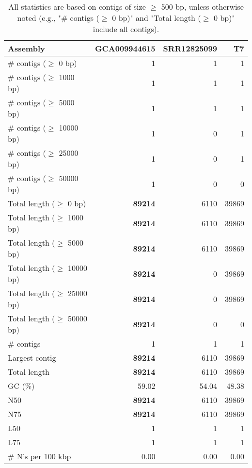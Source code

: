 \documentclass[12pt,a4paper]{article}
\begin{document}
\begin{table}[ht]
\begin{center}
\caption{All statistics are based on contigs of size $\geq$ 500 bp, unless otherwise noted (e.g., "\# contigs ($\geq$ 0 bp)" and "Total length ($\geq$ 0 bp)" include all contigs).}
\begin{tabular}{|l*{3}{|r}|}
\hline
Assembly & GCA009944615 & SRR12825099 & T7 \\ \hline
\# contigs ($\geq$ 0 bp) & 1 & 1 & 1 \\ \hline
\# contigs ($\geq$ 1000 bp) & 1 & 1 & 1 \\ \hline
\# contigs ($\geq$ 5000 bp) & 1 & 1 & 1 \\ \hline
\# contigs ($\geq$ 10000 bp) & 1 & 0 & 1 \\ \hline
\# contigs ($\geq$ 25000 bp) & 1 & 0 & 1 \\ \hline
\# contigs ($\geq$ 50000 bp) & 1 & 0 & 0 \\ \hline
Total length ($\geq$ 0 bp) & {\bf 89214} & 6110 & 39869 \\ \hline
Total length ($\geq$ 1000 bp) & {\bf 89214} & 6110 & 39869 \\ \hline
Total length ($\geq$ 5000 bp) & {\bf 89214} & 6110 & 39869 \\ \hline
Total length ($\geq$ 10000 bp) & {\bf 89214} & 0 & 39869 \\ \hline
Total length ($\geq$ 25000 bp) & {\bf 89214} & 0 & 39869 \\ \hline
Total length ($\geq$ 50000 bp) & {\bf 89214} & 0 & 0 \\ \hline
\# contigs & 1 & 1 & 1 \\ \hline
Largest contig & {\bf 89214} & 6110 & 39869 \\ \hline
Total length & {\bf 89214} & 6110 & 39869 \\ \hline
GC (\%) & 59.02 & 54.04 & 48.38 \\ \hline
N50 & {\bf 89214} & 6110 & 39869 \\ \hline
N75 & {\bf 89214} & 6110 & 39869 \\ \hline
L50 & 1 & 1 & 1 \\ \hline
L75 & 1 & 1 & 1 \\ \hline
\# N's per 100 kbp & 0.00 & 0.00 & 0.00 \\ \hline
\end{tabular}
\end{center}
\end{table}
\end{document}
